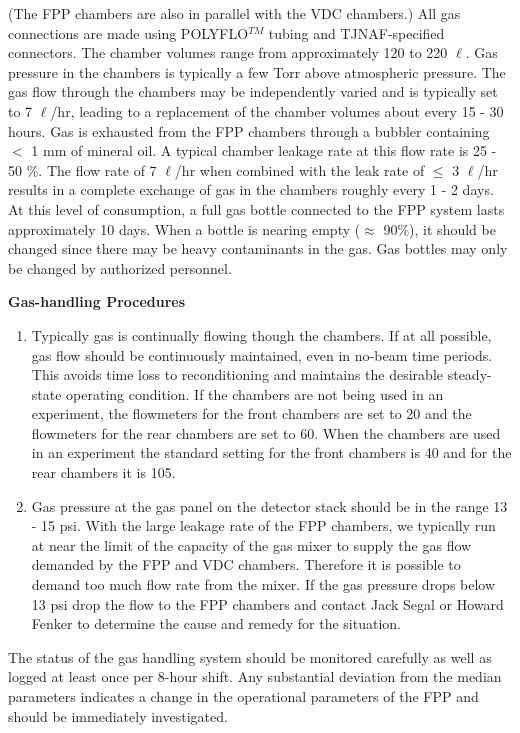 (The FPP chambers are also in parallel with the VDC chambers.)
All gas connections
are made using POLYFLO$^{TM}$ tubing and TJNAF-specified connectors.
The chamber volumes range from approximately
120 to 220 $\ell$.
Gas pressure in the chambers is typically a few Torr above atmospheric
pressure.
The gas flow through the chambers may be independently varied and is
typically set to 7 $\ell$/hr, leading to a replacement of the chamber
volumes about every 15 - 30 hours.
Gas is exhausted from the FPP chambers through a bubbler containing $<$ 1 mm
of mineral oil. A typical chamber leakage rate at this flow rate is 25 - 50
$\%$.
The flow rate of 7 $\ell$/hr when combined with the leak rate of
$\le$ 3 $\ell$/hr results in a complete exchange of gas in the chambers
roughly every 1 - 2 days.
At this level of consumption, a full gas bottle connected to the FPP system
lasts approximately 10 days.
When a bottle is nearing empty ($\approx$ 90$\%$), it should be changed since
there may be heavy contaminants in the gas.
Gas bottles may only be changed by authorized personnel.

\begin{center}
{\bf Gas-handling Procedures}
\end{center}

\begin{enumerate}
\item Typically gas is continually flowing though the chambers.
If at all possible, gas flow should be continuously
maintained, even in no-beam time periods.   This avoids time loss to
reconditioning and maintains the desirable steady-state operating
condition. If the chambers are not being used in an experiment, 
the flowmeters for the front chambers
are set to 20 and the flowmeters for the rear chambers are set to 60.
When the chambers are used in an experiment the standard setting
for the front chambers is 40 and for the rear chambers it is 105. 
\item Gas pressure at the gas panel on the 
detector stack should be in the range
13 - 15 psi. With the large leakage rate of the
FPP chambers, we typically run at near the limit of the capacity of the
gas mixer to supply the gas flow demanded by the FPP and VDC chambers.
Therefore it is possible to demand too much flow rate from the mixer.
If the gas pressure drops below 13 psi drop the flow to the FPP chambers
and contact Jack Segal or Howard Fenker to determine the cause and
remedy for the situation.
\end{enumerate}

The status of the gas handling system should be monitored carefully
as well as logged at least once per 8-hour shift.  Any substantial
deviation from the median parameters indicates a change in the
operational parameters of the FPP and should be immediately
investigated.  

